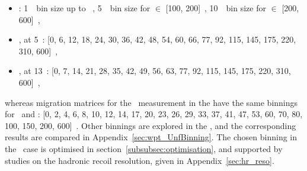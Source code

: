 \begin{itemize}
  \item \ut: 1~\GeV\ bin size up to ~\GeV, 5~\GeV\ bin size for \ut $\in$ [100, 200]~\GeV, 10~\GeV\ bin size for \ut $\in$ [200, 600]~\GeV,
  \item \pttruthv, at 5~\TeV : [0, 6, 12, 18, 24, 30, 36, 42, 48, 54, 60, 66, 77, 92, 115, 145, 175, 220, 310, 600]~\GeV,
  \item \pttruthv, at 13~\TeV : [0, 7, 14, 21, 28, 35, 42, 49, 56, 63, 77, 92, 115, 145, 175, 220, 310, 600]~\GeV,
\end{itemize}
whereas migration matrices for the \ptdilep\ measurement in the \Zboson have the same binnings for \ptdilep\ and \pttruthv: [0, 2, 4, 6, 8, 10, 12, 14, 17, 20, 23, 26, 29, 33, 37, 41, 47, 53, 60, 70, 80, 100, 150, 200, 600]~\GeV.
Other binnings are explored in the \Wboson, and the corresponding results are compared in Appendix~\ref{sec:wpt_UnfBinning}.
The chosen binning in the \Wboson\ case is optimised in section~\ref{subsubsec:optimisation}, and supported by studies on the hadronic recoil resolution, given in Appendix~\ref{sec:hr_reso}.
